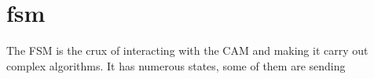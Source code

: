 \section{fsm}
The FSM is the crux of interacting with the CAM and making it carry out complex algorithms. It has numerous states, some of them are sending